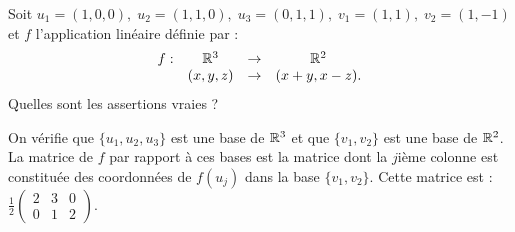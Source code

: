 \begin{question}
Soit $u_1=(1,0,0), \;  u_2=(1,1,0), \;  u_3=(0,1,1), \; v_1=(1,1), \; v_2=(1,-1)$  et $f$ l'application linéaire définie par :
$$\begin{array}{rccc}f:&\mathbb{R}^3 &\to& \mathbb{R}^2\\
& (x,y,z)&\to &(x+y,x-z).  \end{array}$$
Quelles sont les assertions vraies ?
\begin{answers} 
\end{answers}
\begin{explanations} On vérifie que $\{ u_1, u_2, u_3\}$ est une base de $\mathbb{R}^3$ et que $\{ v_1, v_2\}$ est une base de $\mathbb{R}^2$. La matrice de $f$  par rapport à ces  bases    est la matrice  dont la $j$ième colonne est constituée des coordonnées de  $f(u_j)$ dans la base $\{ v_1, v_2\}$. Cette matrice est : $\displaystyle \frac{1}{2} \left(\begin{array}{rcc} 2&3&0\\ 0&1&2\end{array}\right)$.
\end{explanations}
\end{question}

